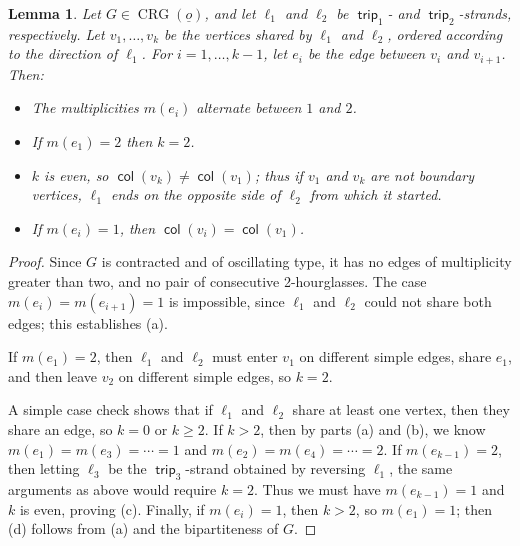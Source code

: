 \documentclass{amsart}
\newtheorem{lemma}[theorem]{Lemma}
\theoremstyle{definition}
\theoremstyle{remark}
\numberwithin{equation}{section}
\DeclareMathOperator{\trip}{\mathsf{trip}}
\DeclareMathOperator{\col}{\mathsf{col}}
\DeclareMathOperator{\crg}{CRG}
\begin{document}
\begin{lemma}
\label{lem:how-trip1-trip2-diverge}
Let $G\in \crg(\underline{o})$, and let $\ell_1$ and $\ell_2$ be $\trip_1$- and $\trip_2$-strands, respectively. Let $v_1,\ldots,v_k$ be the vertices shared by $\ell_1$ and $\ell_2$, ordered according to the direction of $\ell_1$. For $i=1,\ldots,k-1$, let $e_i$ be the edge between $v_i$ and $v_{i+1}$. Then:
\begin{itemize}
    \item[(a)] The multiplicities $m(e_i)$ alternate between $1$ and $2$.
    \item[(b)] If $m(e_1)=2$ then $k=2$.
    \item[(c)] $k$ is even, so $\col(v_k) \neq \col(v_1)$; thus if $v_1$ and $v_k$ are not boundary vertices, $\ell_1$ ends on the opposite side of $\ell_2$ from which it started.
    \item[(d)] If $m(e_i)=1$, then $\col(v_i)=\col(v_1)$.
\end{itemize}
\end{lemma}
\begin{proof}
Since $G$ is contracted and of oscillating type, it has no edges of multiplicity greater than two, and no pair of consecutive 2-hourglasses. The case $m(e_i)=m(e_{i+1})=1$ is impossible, since $\ell_1$ and $\ell_2$ could not share both edges; this establishes (a).

If $m(e_1)=2$, then $\ell_1$ and $\ell_2$ must enter $v_1$ on different simple edges, share $e_1$, and then leave $v_2$ on different simple edges, so $k=2$.

A simple case check shows that if $\ell_1$ and $\ell_2$ share at least one vertex, then they share an edge, so $k=0$ or $k \geq 2$. If $k>2$, then by parts (a) and (b), we know $m(e_1)=m(e_3)=\cdots=1$ and $m(e_2)=m(e_4)=\cdots=2$. If $m(e_{k-1})=2$, then letting $\ell_3$ be the $\trip_3$-strand obtained by reversing $\ell_1$, the same arguments as above would require $k=2$. Thus we must have $m(e_{k-1})=1$ and $k$ is even, proving (c). Finally, if $m(e_i)=1$, then $k>2$, so $m(e_1)=1$; then (d) follows from (a) and the bipartiteness of $G$. 
\end{proof}
\end{document}
